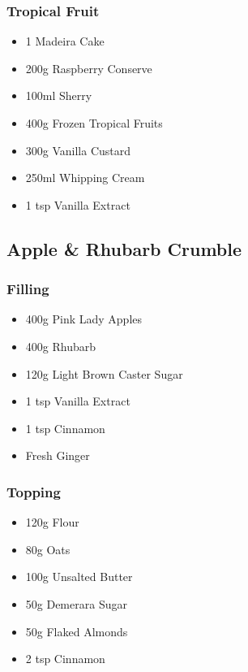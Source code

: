\documentclass[11pt, english]{article}
\begin{document}
		\subsubsection*{Tropical Fruit}

	\begin{itemize}
        \setlength\itemsep{0cm}
                \item 1 Madeira Cake
		\item 200g Raspberry Conserve
		\item 100ml Sherry
		\item 400g Frozen Tropical Fruits
		\item 300g Vanilla Custard
		\item 250ml Whipping Cream
		\item 1 tsp Vanilla Extract
        \end{itemize}

\newpage

	\subsection{Apple \& Rhubarb Crumble}

		\subsubsection*{Filling}

	\begin{itemize}
        \setlength\itemsep{0cm}
                \item 400g Pink Lady Apples
		\item 400g Rhubarb
		\item 120g Light Brown Caster Sugar
		\item 1 tsp Vanilla Extract
		\item 1 tsp Cinnamon
		\item Fresh Ginger
        \end{itemize}

		\subsubsection*{Topping}

	\begin{itemize}
        \setlength\itemsep{0cm}
                \item 120g Flour
		\item 80g Oats
		\item 100g Unsalted Butter
		\item 50g Demerara Sugar
		\item 50g Flaked Almonds
		\item 2 tsp Cinnamon
        \end{itemize}
\end{document}
